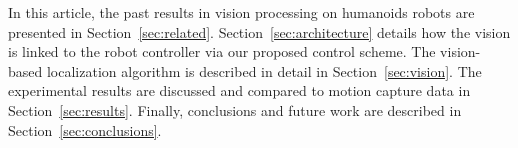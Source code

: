 In this article, the past results in vision processing on humanoids robots are presented in Section~\ref{sec:related}. Section~\ref{sec:architecture} details how the vision is linked to the robot
controller via our proposed control scheme. The vision-based localization algorithm is described in detail in Section~\ref{sec:vision}. The experimental results are discussed and compared to motion capture data
in Section~\ref{sec:results}. Finally, conclusions and future work are described in Section~\ref{sec:conclusions}.
